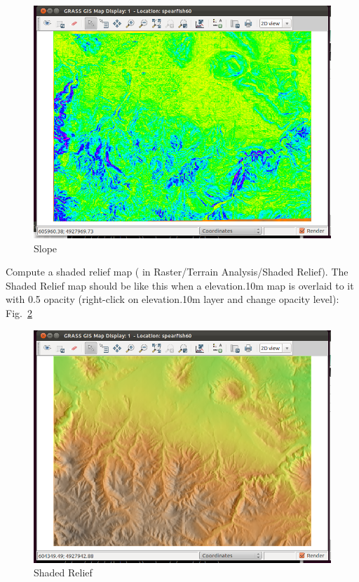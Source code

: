 \begin{figure}[htbp]
   \centering
   \includegraphics[scale=0.35]{grass010.png}
   \caption{Slope}
   \label{fig:grass010}
\end{figure}

Compute a shaded relief map ( in Raster/Terrain Analysis/Shaded Relief).
The Shaded Relief map should be like this when a elevation.10m map is overlaid to it with 0.5 opacity (right-click on elevation.10m layer and change opacity level): Fig.~\ref{fig:grass011}

\begin{figure}[htbp]
   \centering
   \includegraphics[scale=0.35]{grass011.png}
   \caption{Shaded Relief}
   \label{fig:grass011}
\end{figure}

